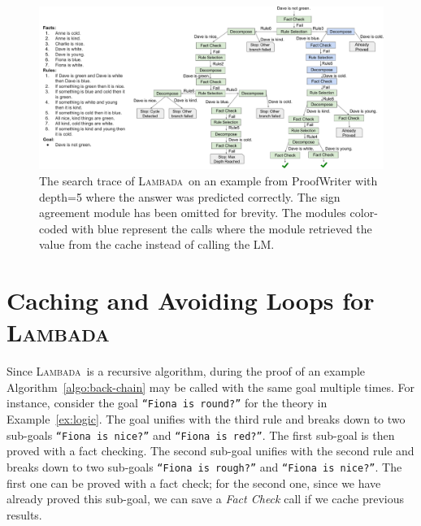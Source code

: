 \documentclass[11pt]{article}
\newcommand{\algo}{\textsc{Lambada}}
\newcommand{\module}[1]{\emph{#1}}
\begin{document}



\appendix

\begin{figure}[t]
  \centering
  \includegraphics[width=\textwidth]{lambada_depth5_example.pdf}
  \caption{%
  \label{fig:success-depth5} %
    The search trace of \algo\ on an example from ProofWriter with depth=5 where the answer was predicted correctly. The sign agreement module has been omitted for brevity. The modules color-coded with blue represent the calls where the module retrieved the value from the cache instead of calling the LM.
  }
\end{figure}

\section{Caching and Avoiding Loops for \algo} \label{sec:cache}
Since \algo\ is a recursive algorithm, during the proof of an example Algorithm~\ref{algo:back-chain} may be called with the same goal multiple times. For instance, consider the goal \texttt{``Fiona is round?''} for the theory in Example~\ref{ex:logic}. The goal unifies with the third rule and breaks down to two sub-goals \texttt{``Fiona is nice?''} and \texttt{``Fiona is red?''}. The first sub-goal is then proved with a fact checking. The second sub-goal unifies with the second rule and breaks down to two sub-goals \texttt{``Fiona is rough?''} and  \texttt{``Fiona is nice?''}. The first one can be proved with a fact check; for the second one, since we have already proved this sub-goal, we can save a \module{Fact Check} call if we cache previous results. 
\end{document}

